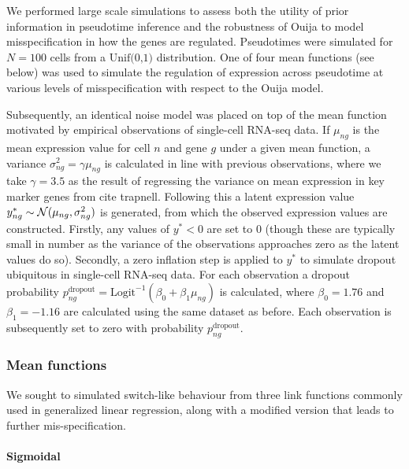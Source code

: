 
We performed large scale simulations to assess both the utility of prior information in pseudotime inference and the robustness of Ouija to model misspecification in how the genes are regulated. Pseudotimes were simulated for $N=100$ cells from a $\text{Unif(0,1)}$ distribution. One of four mean functions (see below) was used to simulate the regulation of expression across pseudotime at various levels of misspecification with respect to the Ouija model.

Subsequently, an identical noise model was placed on top of the mean function motivated by empirical observations of single-cell RNA-seq data. If $\mu_{ng}$ is the mean expression value for cell $n$ and gene $g$ under a given mean function, a variance $\sigma^2_{ng} = \gamma \mu_{ng}$ is calculated in line with previous observations, where we take $\gamma = 3.5$ as the result of regressing the variance on mean expression in key marker genes from cite trapnell. Following this a latent expression value $y^*_{ng} \sim \mathcal{N}(\mu_{ng}, \sigma_{ng}^2)$ is generated, from which the observed expression values are constructed. Firstly, any values of $y^* < 0$ are set to 0 (though these are typically small in number as the variance of the observations approaches zero as the latent values do so). Secondly, a zero inflation step is applied to $y^*$ to simulate dropout ubiquitous in single-cell RNA-seq data. For each observation a dropout probability $p^{\text{dropout}}_{ng} = \text{Logit}^{-1}(\beta_0 + \beta_1 \mu_{ng})$ is calculated, where $\beta_0 = 1.76$ and $\beta_1 = -1.16$ are calculated using the same dataset as before. Each observation is subsequently set to zero with probability $p^{\text{dropout}}_{ng}$.

\subsubsection{Mean functions}

We sought to simulated switch-like behaviour from three link functions commonly used in generalized linear regression, along with a modified version that leads to further mis-specification.

\paragraph{Sigmoidal}

